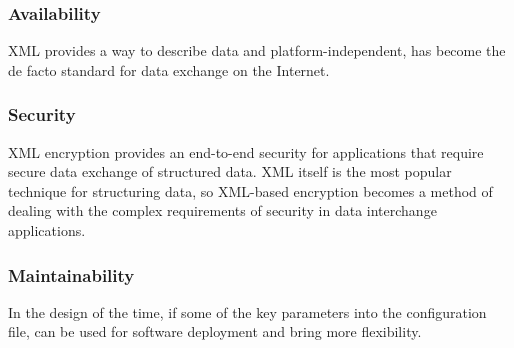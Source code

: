 \subsubsection{Availability}

XML provides a way to describe data and platform-independent,
has become the de facto standard for data exchange on the Internet.


\subsubsection{Security}
XML encryption provides an end-to-end security for applications that require secure data exchange of structured data. XML itself is the most popular technique for structuring data, so XML-based encryption becomes a method of dealing with the complex requirements of security in data interchange applications.


\subsubsection{Maintainability}
In the design of the time, if some of the key parameters into the configuration file, can be used for software deployment and bring more flexibility.


